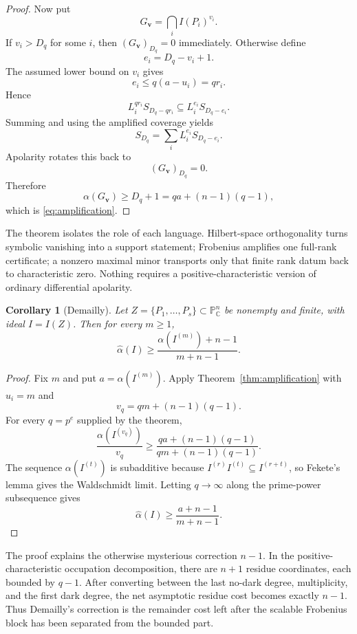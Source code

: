 \documentclass[11pt]{article}
\newtheorem{corollary}[theorem]{Corollary}
\theoremstyle{remark}
\newcommand{\PP}{\mathbb P}
\newcommand{\CC}{\mathbb C}
\newcommand{\whalpha}{\widehat{\alpha}}
\begin{document}
\begin{proof}
Now put
\[
  G_{\mathbf v}=\bigcap_iI(P_i)^{v_i}.
\]
If $v_i>D_q$ for some $i$, then $(G_{\mathbf v})_{D_q}=0$ immediately.  Otherwise define
\[
  e_i=D_q-v_i+1.
\]
The assumed lower bound on $v_i$ gives
\[
  e_i\le q(a-u_i)=qr_i.
\]
Hence
\[
  L_i^{qr_i}S_{D_q-qr_i}
  \subseteq
  L_i^{e_i}S_{D_q-e_i}.
\]
Summing and using the amplified coverage yields
\[
  S_{D_q}=\sum_iL_i^{e_i}S_{D_q-e_i}.
\]
Apolarity rotates this back to
\[
  (G_{\mathbf v})_{D_q}=0.
\]
Therefore
\[
  \alpha(G_{\mathbf v})\ge D_q+1
  =qa+(n-1)(q-1),
\]
which is \eqref{eq:amplification}.
\end{proof}

The theorem isolates the role of each language.  Hilbert-space orthogonality turns symbolic vanishing into a support statement; Frobenius amplifies one full-rank certificate; a nonzero maximal minor transports only that finite rank datum back to characteristic zero.  Nothing requires a positive-characteristic version of ordinary differential apolarity.

\begin{corollary}[Demailly]
\label{cor:demailly}
Let $Z=\{P_1,\ldots,P_s\}\subset\PP^n_{\CC}$ be nonempty and finite, with ideal $I=I(Z)$.  Then for every $m\ge1$,
\[
  \whalpha(I)
  \ge
  \frac{\alpha(I^{(m)})+n-1}{m+n-1}.
\]
\end{corollary}

\begin{proof}
Fix $m$ and put $a=\alpha(I^{(m)})$.  Apply Theorem~\ref{thm:amplification} with $u_i=m$ and
\[
  v_q=qm+(n-1)(q-1).
\]
For every $q=p^e$ supplied by the theorem,
\[
  \frac{\alpha(I^{(v_q)})}{v_q}
  \ge
  \frac{qa+(n-1)(q-1)}{qm+(n-1)(q-1)}.
\]
The sequence $\alpha(I^{(t)})$ is subadditive because $I^{(r)}I^{(t)}\subseteq I^{(r+t)}$, so Fekete's lemma gives the Waldschmidt limit.  Letting $q\to\infty$ along the prime-power subsequence gives
\[
  \whalpha(I)
  \ge
  \frac{a+n-1}{m+n-1}.
\]
\end{proof}

The proof explains the otherwise mysterious correction $n-1$.  In the positive-characteristic occupation decomposition, there are $n+1$ residue coordinates, each bounded by $q-1$.  After converting between the last no-dark degree, multiplicity, and the first dark degree, the net asymptotic residue cost becomes exactly $n-1$.  Thus Demailly's correction is the remainder cost left after the scalable Frobenius block has been separated from the bounded part.
\end{document}

